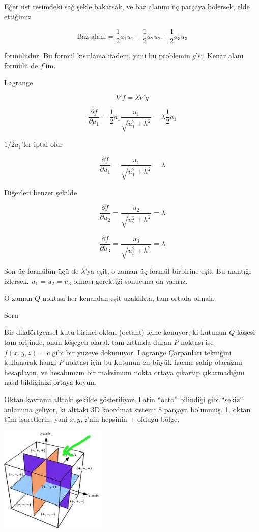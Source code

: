 \documentclass[12pt,fleqn]{article}\usepackage{../../common}
\begin{document}
Eğer üst resimdeki sağ şekle bakarsak, ve baz alanını üç parçaya bölersek,
elde ettiğimiz

$$ \textrm{Baz alanı} = 
\frac{1}{2}a_1u_1 +  
\frac{1}{2}a_2u_2 +  
\frac{1}{2}a_3u_3
$$

formülüdür. Bu formül kısıtlama ifadem, yani bu problemin $g$'sı. Kenar
alanı formülü de $f$'im. 

Lagrange

$$ \nabla f = \lambda \nabla g $$

$$ \frac{\partial f}{\partial u_1} =
\frac{1}{2}a_1 \frac{u_1}{\sqrt{u_1^2 + h^2}} = 
\lambda \frac{1}{2}a_1
$$

$1/2a_1$'ler iptal olur

$$
\frac{\partial f}{\partial u_1} =
\frac{u_1}{\sqrt{u_1^2 + h^2}} = \lambda 
$$

Diğerleri benzer şekilde

$$
\frac{\partial f}{\partial u_2} =
\frac{u_2}{\sqrt{u_2^2 + h^2}} = \lambda 
$$

$$
\frac{\partial f}{\partial u_3} =
\frac{u_3}{\sqrt{u_3^2 + h^2}} = \lambda 
$$

Son üç formülün üçü de $\lambda$'ya eşit, o zaman üç formül birbirine
eşit. Bu mantığı izlersek, $u_1 = u_2 = u_3$ olması gerektiği sonucuna da
varırız. 

O zaman $Q$ noktası her kenardan eşit uzaklıkta, tam ortada olmalı.

Soru

Bir dikdörtgensel kutu birinci oktan (octant) içine konuyor, ki kutunun $Q$
köşesi tam orijinde, onun köşegen olarak tam zıttında duran $P$ noktası
ise $f(x,y,z)=c$ gibi bir yüzeye dokunuyor. Lagrange Çarpanları tekniğini
kullanarak hangi $P$ noktası için bu kutunun en büyük hacme sahip
olacağını hesaplayın, ve hesabınızın bir maksimum nokta ortaya çıkartıp
çıkarmadığını nasıl bildiğinizi ortaya koyun. 

Oktan kavramı alttaki şekilde gösteriliyor, Latin ``octo'' bilindiği gibi
``sekiz'' anlamına geliyor, ki alttaki 3D koordinat sistemi 8 parçaya
bölünmüş. 1. oktan tüm işaretlerin, yani $x,y,z$'nin hepsinin + olduğu
bölge. 

\begin{center}
\includegraphics[height=5cm]{octant.png}
\end{center}
\end{document}
